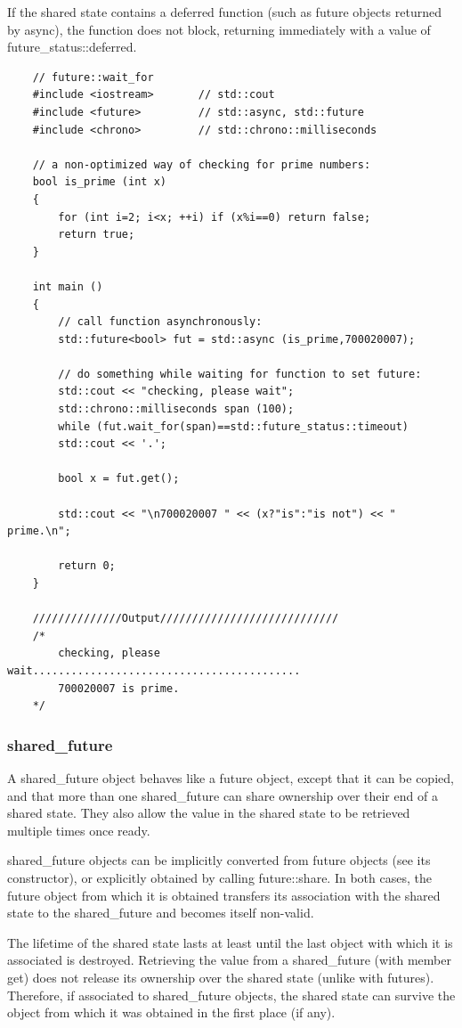 \documentclass[UTF8,a4paper,12pt]{ctexbook}
\begin{document}
			If the shared state contains a deferred function (such as future objects returned by async), the function does not block, returning immediately with a value of future\_status::deferred.
\begin{lstlisting}
	// future::wait_for
	#include <iostream>       // std::cout
	#include <future>         // std::async, std::future
	#include <chrono>         // std::chrono::milliseconds
	
	// a non-optimized way of checking for prime numbers:
	bool is_prime (int x) 
	{
		for (int i=2; i<x; ++i) if (x%i==0) return false;
		return true;
	}
	
	int main ()
	{
		// call function asynchronously:
		std::future<bool> fut = std::async (is_prime,700020007); 
		
		// do something while waiting for function to set future:
		std::cout << "checking, please wait";
		std::chrono::milliseconds span (100);
		while (fut.wait_for(span)==std::future_status::timeout)
		std::cout << '.';
		
		bool x = fut.get();
		
		std::cout << "\n700020007 " << (x?"is":"is not") << " prime.\n";
		
		return 0;
	}
	
	//////////////Output////////////////////////////
	/*
		checking, please wait..........................................
		700020007 is prime.
	*/
\end{lstlisting}			
			 
		\subsubsection{shared\_future}A shared\_future object behaves like a future object, except that it can be copied, and that more than one shared\_future can share ownership over their end of a shared state. They also allow the value in the shared state to be retrieved multiple times once ready.
		
		shared\_future objects can be implicitly converted from future objects (see its constructor), or explicitly obtained by calling future::share. In both cases, the future object from which it is obtained transfers its association with the shared state to the shared\_future and becomes itself non-valid.
		
		The lifetime of the shared state lasts at least until the last object with which it is associated is destroyed. Retrieving the value from a shared\_future (with member get) does not release its ownership over the shared state (unlike with futures). Therefore, if associated to shared\_future objects, the shared state can survive the object from which it was obtained in the first place (if any).
		
\end{document}
